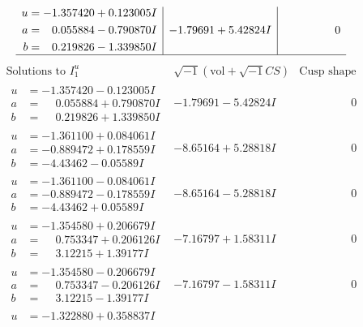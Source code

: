 \documentclass[1p]{elsarticle_modified}
\theoremstyle{definition}
\newcommand{\I}{\sqrt{-1}}
\begin{document}
$$\begin{array}{c|c|c}
\begin{aligned}
u &= -1.357420 + 0.123005 I \\
a &= \phantom{-}0.055884 - 0.790870 I \\
b &= \phantom{-}0.219826 - 1.339850 I\end{aligned}
 & -1.79691 + 5.42824 I & \phantom{-0.000000 } 0\\
 \hline 
 \end{array}$$\newpage$$\begin{array}{c|c|c}  
\text{Solutions to }I^u_{1}& \I (\text{vol} + \sqrt{-1}CS) & \text{Cusp shape}\\
 \hline 
\begin{aligned}
u &= -1.357420 - 0.123005 I \\
a &= \phantom{-}0.055884 + 0.790870 I \\
b &= \phantom{-}0.219826 + 1.339850 I\end{aligned}
 & -1.79691 - 5.42824 I & \phantom{-0.000000 } 0 \\ \hline\begin{aligned}
u &= -1.361100 + 0.084061 I \\
a &= -0.889472 + 0.178559 I \\
b &= -4.43462 - 0.05589 I\end{aligned}
 & -8.65164 + 5.28818 I & \phantom{-0.000000 } 0 \\ \hline\begin{aligned}
u &= -1.361100 - 0.084061 I \\
a &= -0.889472 - 0.178559 I \\
b &= -4.43462 + 0.05589 I\end{aligned}
 & -8.65164 - 5.28818 I & \phantom{-0.000000 } 0 \\ \hline\begin{aligned}
u &= -1.354580 + 0.206679 I \\
a &= \phantom{-}0.753347 + 0.206126 I \\
b &= \phantom{-}3.12215 + 1.39177 I\end{aligned}
 & -7.16797 + 1.58311 I & \phantom{-0.000000 } 0 \\ \hline\begin{aligned}
u &= -1.354580 - 0.206679 I \\
a &= \phantom{-}0.753347 - 0.206126 I \\
b &= \phantom{-}3.12215 - 1.39177 I\end{aligned}
 & -7.16797 - 1.58311 I & \phantom{-0.000000 } 0 \\ \hline\begin{aligned}
u &= -1.322880 + 0.358837 I \\

\end{aligned}
\end{array}$$
\end{document}
